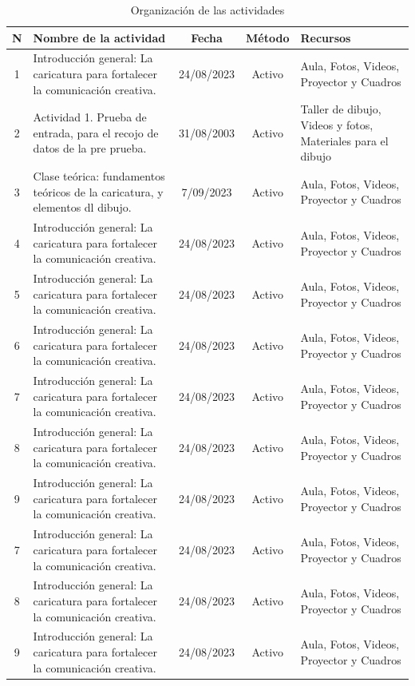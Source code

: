 \documentclass[12pt,a4paper]{article}
\begin{document}
\begin{table}
	\caption{Organización de las actividades}
	\label{Organizacion}
	\begin{tabular}{cp{4.5cm}ccp{4cm}}\toprule
		N & \bf Nombre de la actividad                                                    & \bf Fecha  & \bf Método & \bf Recursos                                                \\\midrule
		1 & Introducción general: La caricatura para fortalecer la comunicación creativa. & 24/08/2023 & Activo     & Aula, Fotos, Videos, Proyector  y Cuadros                   \\\midrule
		2 & Actividad 1. Prueba de entrada, para el recojo de datos de la pre prueba.     & 31/08/2003 & Activo     & Taller de dibujo, Videos y fotos, Materiales para el dibujo \\\midrule
		3 & Clase teórica: fundamentos teóricos de la caricatura, y elementos dl dibujo.  & 7/09/2023  & Activo     & Aula, Fotos, Videos, Proyector  y Cuadros                   \\\midrule
		4 & Introducción general: La caricatura para fortalecer la comunicación creativa. & 24/08/2023 & Activo     & Aula, Fotos, Videos, Proyector  y Cuadros                   \\\midrule
		5 & Introducción general: La caricatura para fortalecer la comunicación creativa. & 24/08/2023 & Activo     & Aula, Fotos, Videos, Proyector  y Cuadros                   \\\midrule
		6 & Introducción general: La caricatura para fortalecer la comunicación creativa. & 24/08/2023 & Activo     & Aula, Fotos, Videos, Proyector  y Cuadros                   \\\midrule
		7 & Introducción general: La caricatura para fortalecer la comunicación creativa. & 24/08/2023 & Activo     & Aula, Fotos, Videos, Proyector  y Cuadros                   \\\midrule
		8 & Introducción general: La caricatura para fortalecer la comunicación creativa. & 24/08/2023 & Activo     & Aula, Fotos, Videos, Proyector  y Cuadros                   \\\midrule
		9 & Introducción general: La caricatura para fortalecer la comunicación creativa. & 24/08/2023 & Activo     & Aula, Fotos, Videos, Proyector  y Cuadros                   \\\midrule
		7 & Introducción general: La caricatura para fortalecer la comunicación creativa. & 24/08/2023 & Activo     & Aula, Fotos, Videos, Proyector  y Cuadros                   \\\midrule
8 & Introducción general: La caricatura para fortalecer la comunicación creativa. & 24/08/2023 & Activo     & Aula, Fotos, Videos, Proyector  y Cuadros                   \\\midrule
9 & Introducción general: La caricatura para fortalecer la comunicación creativa. & 24/08/2023 & Activo     & Aula, Fotos, Videos, Proyector  y Cuadros                   \\\bottomrule
	\end{tabular}
\end{table}
\end{document}
